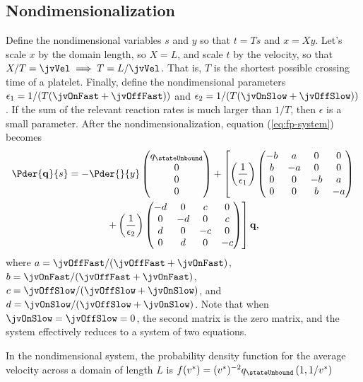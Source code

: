 \subsection{Nondimensionalization}
\label{sec:nondim}

Define the nondimensional variables $s$ and $y$ so that $t = Ts$ and
$x = Xy$. Let's scale $x$ by the domain length, so $X = L$, and scale
$t$ by the velocity, so that $X/T = \jvVel \implies T = L/\jvVel$. That
is, $T$ is the shortest possible crossing time of a platelet. Finally,
define the nondimensional parameters
$\epsilon_1 = 1/(T(\jvOnFast + \jvOffFast))$ and
$\epsilon_2 = 1/(T(\jvOnSlow + \jvOffSlow))$. If the sum of the relevant
reaction rates is much larger than $1/T$, then $\epsilon$ is a small
parameter. After the nondimensionalization, equation
(\ref{eq:fp-system}) becomes
\begin{multline}
  \label{eq:nd-system}
  \Pder{\mathbf{q}}{s} = -\Pder{}{y}
  \begin{pmatrix}
    q_{\stateUnbound} \\ 0 \\ 0 \\ 0
  \end{pmatrix}
  + \left[\left(\frac{1}{\epsilon_1}\right) 
  \begin{pmatrix}
    - b & a & 0 & 0 \\
    b & - a & 0 & 0 \\
    0 & 0 & - b & a \\
    0 & 0 & b & - a
  \end{pmatrix} \right.
  \\
  \left. + \left(\frac{1}{\epsilon_2}\right)
  \begin{pmatrix}
    - d & 0 & c & 0 \\
    0 & - d & 0 & c \\
    d & 0 & - c & 0 \\
    0 & d & 0 & - c
  \end{pmatrix}\right]
  \mathbf{q},
\end{multline}
where $a = \jvOffFast/(\jvOffFast + \jvOnFast)$,
$b = \jvOnFast/(\jvOffFast + \jvOnFast)$,
$c = \jvOffSlow/(\jvOffSlow + \jvOnSlow)$, and
$d = \jvOnSlow/(\jvOffSlow + \jvOnSlow)$. Note that when
$\jvOnSlow = \jvOffSlow = 0$, the second matrix is the zero matrix, and
the system effectively reduces to a system of two equations.

In the nondimensional system, the probability density function for the
average velocity across a domain of length $L$ is 
$f(v^*) = ({v^*})^{-2} q_{\stateUnbound} \left(1, 1/v^*\right)$

